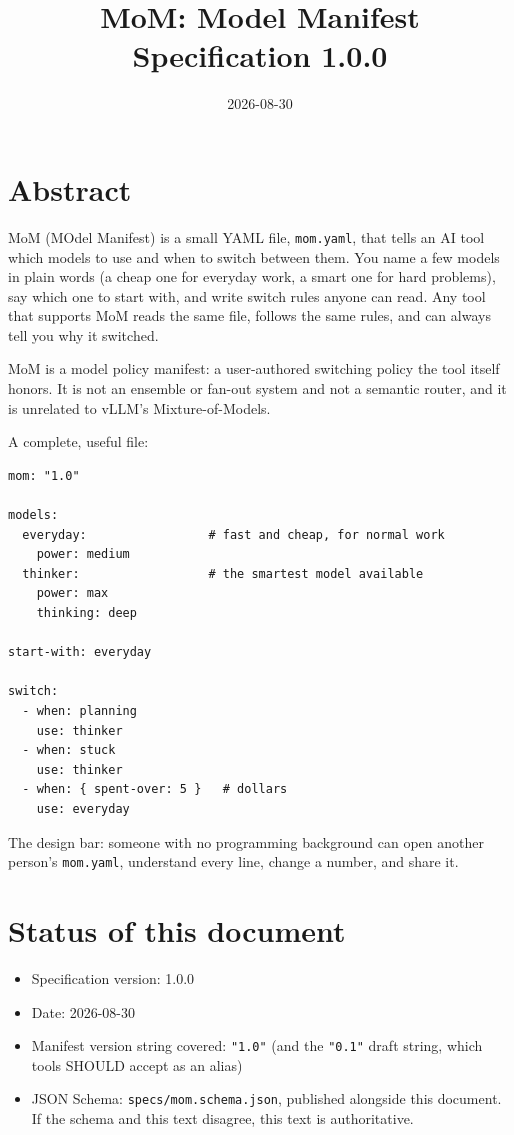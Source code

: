 \documentclass[11pt]{article}
\title{MoM: Model Manifest\\\large Specification 1.0.0}
\author{}
\date{2026-08-30}
\newcommand{\key}[1]{\texttt{#1}}
\begin{document}
\maketitle

\section{Abstract}

MoM (MOdel Manifest) is a small YAML file, \key{mom.yaml}, that tells an
AI tool which models to use and when to switch between them. You name a
few models in plain words (a cheap one for everyday work, a smart one
for hard problems), say which one to start with, and write switch rules
anyone can read. Any tool that supports MoM reads the same file, follows
the same rules, and can always tell you why it switched.

MoM is a model policy manifest: a user-authored switching policy the
tool itself honors. It is not an ensemble or fan-out system and not a
semantic router, and it is unrelated to vLLM's Mixture-of-Models.

A complete, useful file:

\begin{lstlisting}
mom: "1.0"

models:
  everyday:                 # fast and cheap, for normal work
    power: medium
  thinker:                  # the smartest model available
    power: max
    thinking: deep

start-with: everyday

switch:
  - when: planning
    use: thinker
  - when: stuck
    use: thinker
  - when: { spent-over: 5 }   # dollars
    use: everyday
\end{lstlisting}

The design bar: someone with no programming background can open another
person's \key{mom.yaml}, understand every line, change a number, and share it.

\section{Status of this document}

\begin{itemize}
  \item Specification version: 1.0.0
  \item Date: 2026-08-30
  \item Manifest version string covered: \key{"1.0"} (and the \key{"0.1"} draft string, which tools SHOULD accept as an alias)
  \item JSON Schema: \key{specs/mom.schema.json}, published alongside this
        document. If the schema and this text disagree, this text is
        authoritative.
\end{itemize}
\end{document}
